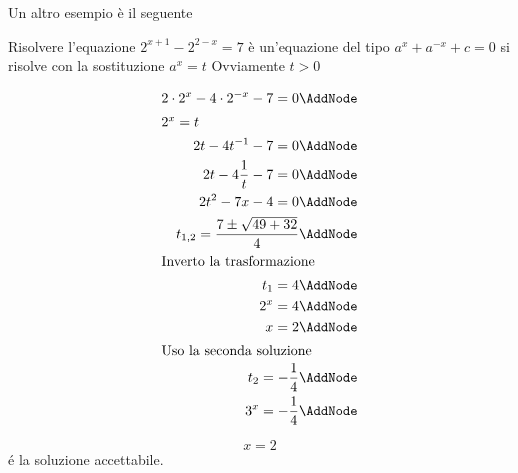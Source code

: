 Un altro esempio è il seguente
\begin{esempio}
	Risolvere l'equazione $ 2^{x+1}-2^{2-x}=7$ 
	è un'equazione del tipo $a^{x}+a^{-x}+c=0$ si risolve con la sostituzione $a^{x}=t$
	Ovviamente $t>0$ 
	\begin{NodesList} [margin=4cm]
		\begin{align*}
			 2\cdot 2^{x}-4\cdot 2^{-x}-7=0\AddNode\\
			 \intertext{\hfil $2^x=t$}
			2t-4t^{-1}-7=0\AddNode\\
			2t-4\dfrac{1}{t}-7=0\AddNode\\
			2t^2-7x-4=0\AddNode\\
			t_{1,2}=\dfrac{7\pm\sqrt{49+32}}{4}\AddNode\\
			\intertext{\hfil Inverto la trasformazione}
			t_{1}=4\AddNode\\
			2^{x}=4\AddNode\\
			x=2\AddNode\\
			\intertext{\hfil Uso la seconda soluzione}
			t_{2}=-\dfrac{1}{4} \AddNode\\
			3^x=-\dfrac{1}{4}\AddNode
		\end{align*}
		\LinkNodes{}%
	\end{NodesList}
	\[x=2\]
	\'{e} la soluzione accettabile.
\end{esempio}
